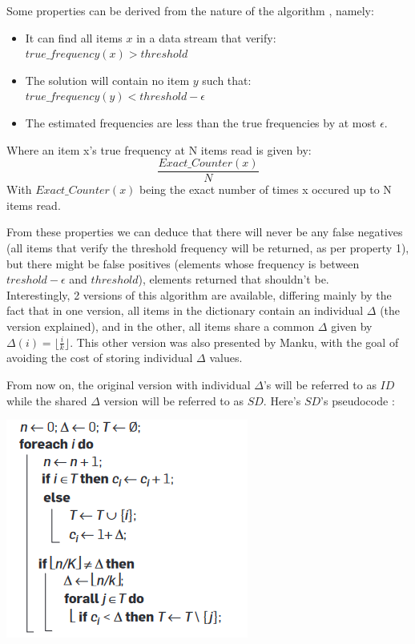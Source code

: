 \documentclass[...]{revdetua}
\begin{document}
Some properties can be derived from the nature of the algorithm \cite{Manku}, namely:
\begin{itemize}
\item It can find all items $x$ in a data stream that verify: $true\_frequency(x)>threshold$
\item The solution will contain no item $y$ such that: $true\_frequency(y)<threshold-\epsilon$
\item The estimated frequencies are less than the true frequencies by at most $\epsilon$.
\end{itemize}
Where an item x's true frequency at N items read is given by:
$$\frac{Exact\_Counter(x)}{N}$$
With $Exact\_Counter(x)$ being the exact number of times x occured up to N items read.\par
From these properties \cite{Manku} we can deduce that there will never be any false negatives (all items that verify the threshold frequency will be returned, as per property 1), but there might be false positives (elements whose frequency is between $treshold-\epsilon$ and $threshold$), elements returned that shouldn't be.\\
Interestingly, 2 versions of this algorithm are available, differing mainly by the fact that in one version, all items in the dictionary contain an individual $\Delta$ (the version explained), and in the other, all items share a common $\Delta$ given by $\Delta(i)=\lfloor{\frac{i}{k}}\rfloor$.
This other version was also presented by Manku, with the goal of avoiding the cost of storing individual $\Delta$ values.\par From now on, the original version with individual $\Delta$'s will be referred to as $ID$ while the shared $\Delta$ version will be referred to as $SD$.
Here's $SD$'s pseudocode \cite{Cormode}:

\includegraphics[scale=1]{pseudo.png}
\end{document}
